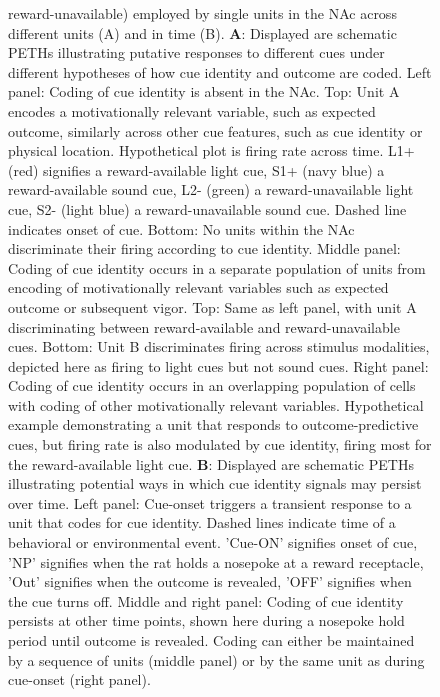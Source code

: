 \documentclass[11pt]{article}
\newcommand{\bsf}[1]{\textbf{#1}}
\begin{document}
\begin{figure}[ht!]
{  reward-unavailable) employed by single units in the NAc across
  different units (A) and in time (B). \bsf{A}: Displayed are
  schematic PETHs illustrating putative responses to different cues
  under different hypotheses of how cue identity and outcome are
  coded. Left panel: Coding of cue identity is absent in the NAc. Top:
  Unit A encodes a motivationally relevant variable, such as expected
  outcome, similarly across other cue features, such as cue identity
  or physical location. Hypothetical plot is firing rate across
  time. L1+ (red) signifies a reward-available light cue, S1+ (navy
  blue) a reward-available sound cue, L2- (green) a reward-unavailable
  light cue, S2- (light blue) a reward-unavailable sound cue. Dashed
  line indicates onset of cue. Bottom: No units within the NAc
  discriminate their firing according to cue identity. Middle panel:
  Coding of cue identity occurs in a separate population of units from
  encoding of motivationally relevant variables such as expected
  outcome or subsequent vigor. Top: Same as left panel, with unit A
  discriminating between reward-available and reward-unavailable
  cues. Bottom: Unit B discriminates firing across stimulus
  modalities, depicted here as firing to light cues but not sound
  cues. Right panel: Coding of cue identity occurs in an overlapping
  population of cells with coding of other motivationally relevant
  variables. Hypothetical example demonstrating a unit that responds
  to outcome-predictive cues, but firing rate is also modulated by cue
  identity, firing most for the reward-available light cue. \bsf{B}:
  Displayed are schematic PETHs illustrating potential ways in which
  cue identity signals may persist over time. Left panel: Cue-onset
  triggers a transient response to a unit that codes for cue
  identity. Dashed lines indicate time of a behavioral or
  environmental event. 'Cue-ON' signifies onset of cue, 'NP' signifies
  when the rat holds a nosepoke at a reward receptacle, 'Out'
  signifies when the outcome is revealed, 'OFF' signifies when the cue
  turns off. Middle and right panel: Coding of cue identity persists
  at other time points, shown here during a nosepoke hold period until
  outcome is revealed. Coding can either be maintained by a sequence
  of units (middle panel) or by the same unit as during cue-onset
  (right panel).}
\label{fig:schematic}
\end{figure} \clearpage
\end{document}
